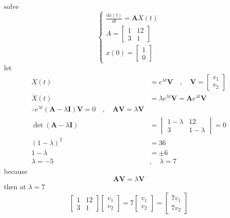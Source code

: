\documentclass[]{article}
\begin{document}
\begin{example}
    solve 
    \begin{equation}
    \begin{cases}
        \displaystyle \frac{dx(t)}{dt} = \mathbf{A}X(t)
        \\
        A = 
        \begin{bmatrix}
            1 & 12\\
            3 & 1 
        \end{bmatrix}
        \\
        x(0) = 
        \begin{bmatrix}
            1\\
            0
        \end{bmatrix}
    \end{cases}
\end{equation}
let 
\begin{align*}
    X(t) &= e^{\lambda t}\mathbf{V} \quad, \quad \mathbf{V} = \begin{bmatrix}v_1\\v_2\end{bmatrix}
    \\
    \dot{X}(t) &= \lambda e^{\lambda t}\mathbf{V} = \mathbf{A}e^{\lambda t}\mathbf{V}
    \\
    \therefore e^{\lambda t} (\mathbf{A}-\lambda\mathbf{I})\mathbf{V} = 0 \quad, \quad \mathbf{A}\mathbf{V} = \lambda\mathbf{V}
    \\
    \det(\mathbf{A}-\lambda\mathbf{I}) &= 
    \begin{vmatrix}
        1-\lambda & 12\\
        3 & 1-\lambda 
    \end{vmatrix} = 0
    \\
    (1-\lambda)^2 &= 36
    \\
    1-\lambda &= \pm 6
    \\
    \lambda = -5 \quad&, \quad \lambda = 7
\end{align*}
because 
\[
    \mathbf{A}\mathbf{V} = \lambda\mathbf{V}    
\] 
then at $\lambda = 7$
\begin{align*}
    \begin{bmatrix}
        1 & 12\\
        3 & 1 
    \end{bmatrix}
    \begin{bmatrix}
        v_1\\v_2
    \end{bmatrix}
    = 
    7\begin{bmatrix}
        v_1\\v_2
    \end{bmatrix}
    =
    \begin{bmatrix}
        7v_1\\7v_2
    \end{bmatrix}
\end{align*}
\end{example}
\end{document}
